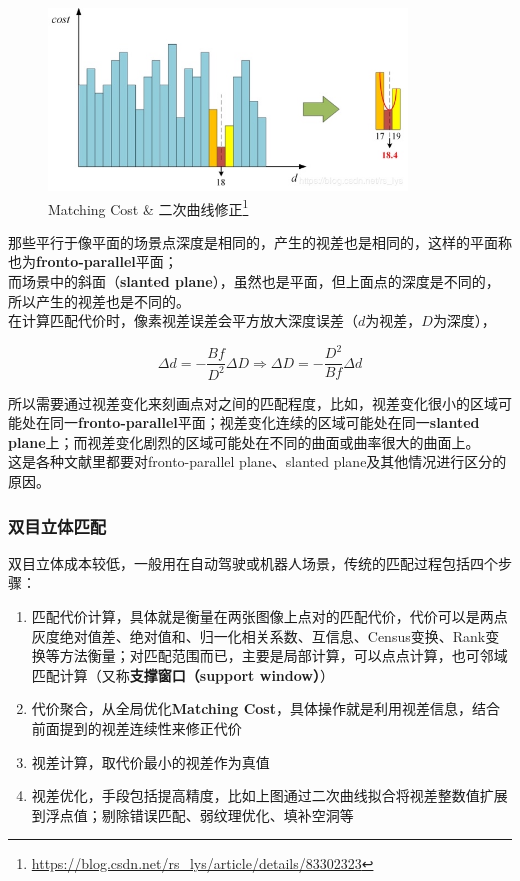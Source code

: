 			\begin{figure}[H]
				\begin{center}
					\includegraphics[width=0.85\textwidth]{images/matching_cost.jpeg}
				\end{center}
				\caption{Matching Cost \& 二次曲线修正\protect\footnote{\url{https://blog.csdn.net/rs_lys/article/details/83302323}}}
			\end{figure}

			那些平行于像平面的场景点深度是相同的，产生的视差也是相同的，这样的平面称也为\textbf{fronto-parallel}平面；\\

			而场景中的斜面（\textbf{slanted plane}），虽然也是平面，但上面点的深度是不同的，所以产生的视差也是不同的。\\

			在计算匹配代价时，像素视差误差会平方放大深度误差（$d$为视差，$D$为深度），

			$$
				\Delta d= -\frac{Bf}{D^2}\Delta D \Rightarrow \Delta D = -\frac{D^2}{Bf}\Delta d
			$$
			
			所以需要通过视差变化来刻画点对之间的匹配程度，比如，视差变化很小的区域可能处在同一\textbf{fronto-parallel}平面；视差变化连续的区域可能处在同一\textbf{slanted plane}上；而视差变化剧烈的区域可能处在不同的曲面或曲率很大的曲面上。\\

			这是各种文献里都要对fronto-parallel plane、slanted plane及其他情况进行区分的原因。

		\subsubsection*{双目立体匹配}
			双目立体成本较低，一般用在自动驾驶或机器人场景，传统的匹配过程包括四个步骤：

			\begin{enumerate}
				\item 匹配代价计算，具体就是衡量在两张图像上点对的匹配代价，代价可以是两点灰度绝对值差、绝对值和、归一化相关系数、互信息、Census变换、Rank变换等方法衡量；对匹配范围而已，主要是局部计算，可以点点计算，也可邻域匹配计算（又称\textbf{支撑窗口（support window）}）
				\item 代价聚合，从全局优化\textbf{Matching Cost}，具体操作就是利用视差信息，结合前面提到的视差连续性来修正代价
				\item 视差计算，取代价最小的视差作为真值
				\item 视差优化，手段包括提高精度，比如上图通过二次曲线拟合将视差整数值扩展到浮点值；剔除错误匹配、弱纹理优化、填补空洞等
			\end{enumerate}

